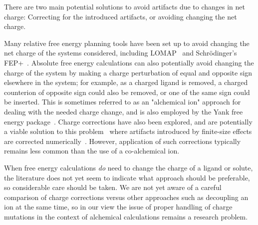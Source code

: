 \documentclass[9pt,bestpractices]{livecoms}
\begin{document}
There are two main potential solutions to avoid artifacts due to changes in net charge: Correcting for the introduced artifacts, or avoiding changing the net charge.

Many relative free energy planning tools have been set up to avoid changing the net charge of the systems considered, including LOMAP~\cite{liu2013lead} and Schr\"{o}dinger's FEP+~\cite{wang2015accurate}. Absolute free energy calculations can also potentially avoid changing the charge of the system by making a charge perturbation of equal and opposite sign elsewhere in the system; for example, as a charged ligand is removed, a charged counterion of opposite sign could also be removed, or one of the same sign could be inserted. This is sometimes referred to as an "alchemical ion" approach for dealing with the needed charge change, and is also employed by the Yank free energy package~\cite{wang2013identifying}.
Charge corrections have also been explored, and are potentially a viable solution to this problem~\cite{mey2018impact} where artifacts introduced by finite-size effects are corrected numerically~\cite{chen2018accurate, ohlknecht2020correcting}. However, application of such corrections typically remains less common than the use of a co-alchemical ion.

When free energy calculations \emph{do} need to change the charge of a ligand or solute, the literature does not yet seem to indicate what approach should be preferable, so considerable care should be taken.
We are not yet aware of a careful comparison of charge corrections versus other approaches such as decoupling an ion at the same time, so in our view the issue of proper handling of charge mutations in the context of alchemical calculations remains a research problem.
\end{document}
